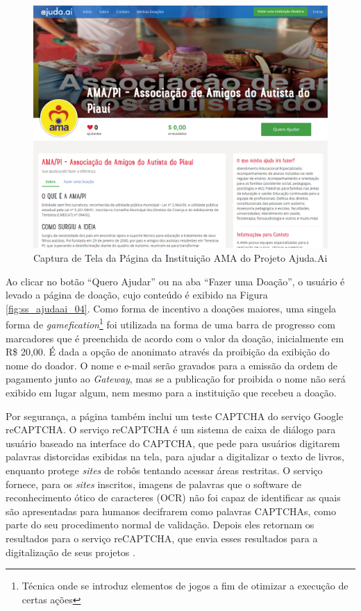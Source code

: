 \begin{figure}[H]
	\caption{\label{fig:ss_ajudaai_03}Captura de Tela da Página da Instituição AMA do Projeto Ajuda.Ai}
    \centering
    \includegraphics[scale=0.45]{imagens/screenshot-ajudaai-03.png}
\end{figure}

Ao clicar no botão ``Quero Ajudar'' ou na aba ``Fazer uma Doação'', o usuário é levado a página de doação, cujo conteúdo é exibido na Figura \ref{fig:ss_ajudaai_04}. Como forma de incentivo a doações maiores, uma singela forma de \emph{gamefication}\footnote{Técnica onde se introduz elementos de jogos a fim de otimizar a execução de certas ações} foi utilizada na forma de uma barra de progresso com marcadores que é preenchida de acordo com o valor da doação, inicialmente em R\$ 20,00. É dada a opção de anonimato através da proibição da exibição do nome do doador. O nome e e-mail serão gravados para a emissão da ordem de pagamento junto ao \emph{Gateway}, mas se a publicação for proibida o nome não será exibido em lugar algum, nem mesmo para a instituição que recebeu a doação.

Por segurança, a página também inclui um teste CAPTCHA do serviço Google reCAPTCHA. O serviço reCAPTCHA é um sistema de caixa de diálogo para usuário baseado na interface do CAPTCHA, que pede para usuários digitarem palavras distorcidas exibidas na tela, para ajudar a digitalizar o texto de livros, enquanto protege \emph{sites} de robôs tentando acessar áreas restritas. O serviço fornece, para os \emph{sites} inscritos, imagens de palavras que o software de reconhecimento ótico de caracteres (OCR) não foi capaz de identificar as quais são apresentadas para humanos decifrarem como palavras CAPTCHAs, como parte do seu procedimento normal de validação. Depois eles retornam os resultados para o serviço reCAPTCHA, que envia esses resultados para a digitalização de seus projetos \cite{wiki:ReCAPTCHA}.

